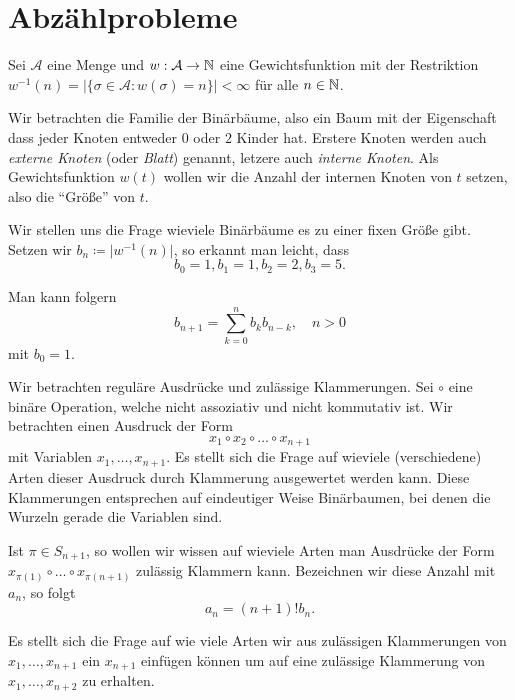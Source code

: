 \section{Abzählprobleme}

Sei $\mathcal{A}$ eine Menge und $w : \mathcal{A} \to \mathbb{N}$ eine Gewichtsfunktion mit der Restriktion $w^{-1}(n) = \vert \{ \sigma \in \mathcal{A} : w(\sigma) = n \} \vert < \infty$ für alle $n \in \mathbb{N}$.

\begin{example}
    Wir betrachten die Familie der Binärbäume, also ein Baum mit der Eigenschaft dass jeder Knoten entweder $0$ oder $2$ Kinder hat. Erstere Knoten werden auch \emph{externe Knoten} (oder \emph{Blatt}) genannt, letzere auch \emph{interne Knoten}. Als Gewichtsfunktion $w(t)$ wollen wir die Anzahl der internen Knoten von $t$ setzen, also die ``Größe'' von $t$.

    Wir stellen uns die Frage wieviele Binärbäume es zu einer fixen Größe gibt. Setzen wir $b_n \coloneqq \vert w^{-1}(n) \vert$, so erkannt man leicht, dass 
    $$ b_0 = 1, b_1 = 1, b_2 = 2, b_3 = 5. $$

    Man kann folgern
    $$ b_{n+1} = \sum_{k=0}^n b_k b_{n-k}, \quad n > 0 $$
    mit $b_0 = 1$.
\end{example}

\begin{example}
    Wir betrachten reguläre Ausdrücke und zulässige Klammerungen. Sei $\circ$ eine binäre Operation, welche nicht assoziativ und nicht kommutativ ist. Wir betrachten einen Ausdruck der Form
    $$ x_1 \circ x_2 \circ \dots \circ x_{n+1} $$
    mit Variablen $x_1, \dots, x_{n+1}$. Es stellt sich die Frage auf wieviele (verschiedene) Arten dieser Ausdruck durch Klammerung ausgewertet werden kann. Diese Klammerungen entsprechen auf eindeutiger Weise Binärbaumen, bei denen die Wurzeln gerade die Variablen sind.

    Ist $\pi \in S_{n+1}$, so wollen wir wissen auf wieviele Arten man Ausdrücke der Form $x_{\pi(1)} \circ \dots \circ x_{\pi(n+1)}$ zulässig Klammern kann. Bezeichnen wir diese Anzahl mit $a_n$, so folgt
    $$ a_n = (n+1)! b_n. $$

    Es stellt sich die Frage auf wie viele Arten wir aus zulässigen Klammerungen von $x_1, \dots, x_{n+1}$ ein $x_{n+1}$ einfügen können um auf eine zulässige Klammerung von $x_1, \dots, x_{n+2}$ zu erhalten.
\end{example}
